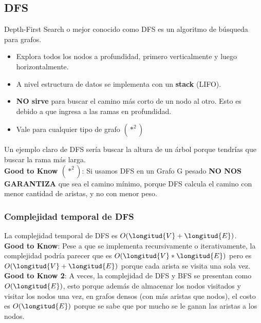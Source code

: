 \documentclass[10pt,a4paper]{article}
\begin{document}
\subsection*{DFS}
Depth-First Search o mejor conocido como DFS es un algoritmo de búsqueda para grafos. 
\begin{itemize}
    \item Explora todos los nodos a profundidad, primero verticalmente y luego horizontalmente.
    \item A nivel estructura de datos se implementa con un \textbf{stack} (LIFO).
    \item \textbf{NO sirve} para buscar el camino más corto de un nodo al otro. Esto es debido a que ingresa a las ramas en profundidad.
    \item Vale para cualquier tipo de grafo $(*^{2})$
\end{itemize}
Un ejemplo claro de DFS sería buscar la altura de un árbol porque tendrías que buscar la rama más larga. \\
\textbf{Good to Know $(*^{2})$}: Si usamos DFS en un Grafo G pesado \textbf{NO NOS GARANTIZA} que sea el camino mínimo, porque DFS calcula el camino con menor cantidad de aristas, y no con menor peso. 
\subsubsection*{Complejidad temporal de DFS}
La complejidad temporal de DFS es $O(\longitud{V} + \longitud{E})$. \\
\textbf{Good to Know}: Pese a que se implementa recursivamente o iterativamente, la complejidad podría parecer que es $O(\longitud{V} * \longitud{E})$ pero es $O(\longitud{V} + \longitud{E})$ porque cada arista se visita una sola vez. \\
\textbf{Good to Know 2}: A veces, la complejidad de DFS y BFS se presentan como $O(\longitud{E})$, esto porque además de almacenar los nodos visitados y visitar los nodos una vez, en grafos densos (con más aristas que nodos), el costo es $O(\longitud{E})$ porque se sabe que por mucho se le ganan las aristas a los nodos.
\end{document}
